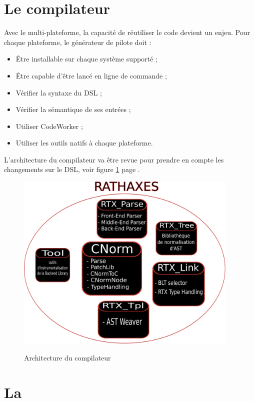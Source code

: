 \documentclass[chapterprefix=off]{rtxreport}
\begin{document}
\section{Le compilateur}

Avec le multi-plateforme, la capacité de réutiliser le code devient un enjeu.
Pour chaque plateforme, le générateur de pilote doit :
\begin{itemize}
\item Être installable sur chaque système supporté ;
\item Être capable d'être lancé en ligne de commande ;
\item Vérifier la syntaxe du DSL ;
\item Vérifier la sémantique de ses entrées ;
\item Utiliser CodeWorker\cite{CodeWorker} ;
\item Utiliser les outils natifs à chaque plateforme.
\end{itemize}

L'architecture du compilateur va être revue pour prendre en compte les
changements sur le DSL, voir figure \ref{diagramme} page \pageref{diagramme}.

\begin{figure}
\begin{center}
\caption{Architecture du compilateur}
\includegraphics[width=0.95\textwidth]{../../../../doc/rathaxes/technical/diagramme_architecture.pdf}
\label{diagramme}
\end{center}
\end{figure}

\section{La \BL}
\end{document}
